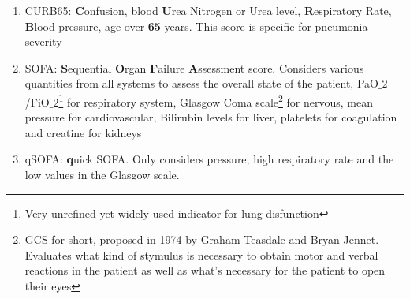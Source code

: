 \begin{enumerate}
\begin{enumerate}
		\item CURB65: \textbf{C}onfusion, blood \textbf{U}rea Nitrogen or Urea level, \textbf{R}espiratory Rate, \textbf{B}lood pressure, age over \textbf{65} years. This score is specific for pneumonia severity \cite{CURB65}
		\item SOFA:  \textbf{S}equential  \textbf{O}rgan  \textbf{F}ailure  \textbf{A}ssessment score. Considers various quantities from all systems to assess the overall state of the patient, PaO$\_2$/FiO$\_2$\footnote{Very unrefined yet widely used indicator for lung disfunction} for respiratory system, Glasgow Coma scale\footnote{GCS for short, proposed in 1974 by Graham Teasdale and Bryan Jennet. Evaluates what kind of stymulus is necessary to obtain motor and verbal reactions in the patient as well as what's necessary for the patient to open their eyes} for nervous, mean pressure for cardiovascular, Bilirubin levels for liver, platelets for coagulation and creatine for kidneys \cite{SOFA}
		\item qSOFA:  \textbf{q}uick SOFA. Only considers pressure, high respiratory rate and the low values in the Glasgow scale.
	\end{enumerate}	
\end{enumerate}

